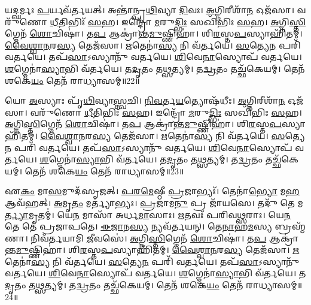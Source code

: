 𑌯𑌦𑍍\mbox{}\-\ul{𑌘}\-𑌰𑍍𑌮𑌃 \ul{𑌪}\-𑌰𑍍𑌯𑌵᳴𑌰𑍍𑌤𑌯𑌤𑍍।
𑌅𑌨𑍍𑌤𑌾॑𑌨𑍍𑌪𑍃\-\ul{𑌥𑌿}\-𑌵𑍍𑌯𑌾 \ul{𑌦𑌿}\-𑌵𑌃।
\-\ul{𑌅}\-𑌗𑍍𑌨𑌿𑌰𑍀𑌶𑌾᳴\-\ul{𑌨} 𑌓𑌜᳴𑌸𑌾।
𑌵𑌰𑍁᳴𑌣𑍋 \ul{𑌧𑍀}\-𑌤𑌿𑌭𑌿𑌃᳴ \ul{𑌸}\-𑌹।
𑌇𑌨𑍍𑌦𑍍𑌰𑍋᳴ \ul{𑌮}\-𑌰𑍁\-\ul{𑌦𑍍𑌭𑌿𑌃} 𑌸𑌖𑌿᳴𑌭𑌿𑌃 \ul{𑌸}\-𑌹।
\-\ul{𑌅}\-𑌗𑍍𑌨𑌿\-\ul{𑌸𑍍𑌤𑌿}\-𑌗𑍍𑌮𑍇𑌨᳴ \ul{𑌶𑍋}\-𑌚𑌿𑌷𑌾॑।
𑌤\-\ul{𑌪} 𑌆𑌕𑍍𑌰𑌾॑𑌨𑍍𑌤\-\ul{𑌮𑍁}\-𑌷𑍍𑌣𑌿𑌹𑌾॑।
𑌶𑌿\-\ul{𑌰}\-𑌸𑍍𑌤\-\ul{𑌪}\-𑌸𑍍𑌯𑌾𑌹𑌿᳴𑌤𑌮𑍍।
\-\ul{𑌵𑍈}\-\-\ul{𑌶𑍍𑌵𑌾}\-\-\ul{𑌨}\-𑌰\-\ul{𑌸𑍍𑌯} 𑌤𑍇𑌜᳴𑌸𑌾।
\-\ul{𑌋}\-𑌤𑍇𑌨𑌾॑\-\ul{𑌸𑍍𑌯} 𑌨𑌿 𑌵᳴𑌰𑍍𑌤𑌯𑍇।
\-\ul{𑌸}\-𑌤𑍍𑌯𑍇\-\ul{𑌨} 𑌪𑌰𑌿᳴ 𑌵𑌰𑍍𑌤𑌯𑍇।
𑌤𑌪᳴\-\ul{𑌸𑌾}\-\-𑌽𑌸𑍍𑌯𑌾𑌨𑍁᳴ 𑌵𑌰𑍍𑌤𑌯𑍇।
\-\ul{𑌶𑌿}\-𑌵𑍇\-\ul{𑌨𑌾}\-𑌸𑍍𑌯𑍋𑌪᳴ 𑌵𑌰𑍍𑌤𑌯𑍇।
\-\ul{𑌶}\-𑌗𑍍𑌮𑍇𑌨𑌾॑\-\ul{𑌸𑍍𑌯𑌾}\-𑌭𑌿 𑌵᳴𑌰𑍍𑌤𑌯𑍇।
𑌤\-\ul{𑌦𑍃}\-𑌤𑌂 𑌤\-\ul{𑌥𑍍𑌸}\-𑌤𑍍𑌯𑌮𑍍।
𑌤\-\ul{𑌦𑍍𑌵𑍍𑌰}\-𑌤𑌂 𑌤𑌚𑍍𑌛᳴𑌕𑍇𑌯𑌮𑍍।
𑌤𑍇𑌨᳴ 𑌶𑌕𑍇\-\ul{𑌯𑌂} 𑌤𑍇𑌨᳴ 𑌰𑌾𑌧𑍍𑌯𑌾𑌸𑌮𑍍॥22॥

𑌯𑍋 \ul{𑌅}\-𑌸𑍍𑌯𑌾𑌃 𑌪𑍃᳴\-\ul{𑌥𑌿}\-𑌵𑍍𑌯𑌾\-\ul{𑌸𑍍𑌤𑍍𑌵}\-𑌚𑌿।
\-\ul{𑌨𑌿}\-\-\ul{𑌵}\-𑌰𑍍𑌤\-\ul{𑌯}\-𑌤𑍍𑌯𑍋𑌷᳴𑌧𑍀𑌃।
\-\ul{𑌅}\-𑌗𑍍𑌨𑌿𑌰𑍀𑌶𑌾᳴\-\ul{𑌨} 𑌓𑌜᳴𑌸𑌾।
𑌵𑌰𑍁᳴𑌣𑍋 \ul{𑌧𑍀}\-𑌤𑌿𑌭𑌿𑌃᳴ \ul{𑌸}\-𑌹।
𑌇𑌨𑍍𑌦𑍍𑌰𑍋᳴ \ul{𑌮}\-𑌰𑍁\-\ul{𑌦𑍍𑌭𑌿𑌃} 𑌸𑌖𑌿᳴𑌭𑌿𑌃 \ul{𑌸}\-𑌹।
\-\ul{𑌅}\-𑌗𑍍𑌨𑌿\-\ul{𑌸𑍍𑌤𑌿}\-𑌗𑍍𑌮𑍇𑌨᳴ \ul{𑌶𑍋}\-𑌚𑌿𑌷𑌾॑।
𑌤\-\ul{𑌪} 𑌆𑌕𑍍𑌰𑌾॑𑌨𑍍𑌤\-\ul{𑌮𑍁}\-𑌷𑍍𑌣𑌿𑌹𑌾॑।
𑌶𑌿\-\ul{𑌰}\-𑌸𑍍𑌤\-\ul{𑌪}\-𑌸𑍍𑌯𑌾𑌹𑌿᳴𑌤𑌮𑍍।
\-\ul{𑌵𑍈}\-\-\ul{𑌶𑍍𑌵𑌾}\-\-\ul{𑌨}\-𑌰\-\ul{𑌸𑍍𑌯} 𑌤𑍇𑌜᳴𑌸𑌾।
\-\ul{𑌋}\-𑌤𑍇𑌨𑌾॑\-\ul{𑌸𑍍𑌯} 𑌨𑌿 𑌵᳴𑌰𑍍𑌤𑌯𑍇।
\-\ul{𑌸}\-𑌤𑍍𑌯𑍇\-\ul{𑌨} 𑌪𑌰𑌿᳴ 𑌵𑌰𑍍𑌤𑌯𑍇।
𑌤𑌪᳴\-\ul{𑌸𑌾}\-\-𑌽𑌸𑍍𑌯𑌾𑌨𑍁᳴ 𑌵𑌰𑍍𑌤𑌯𑍇।
\-\ul{𑌶𑌿}\-𑌵𑍇\-\ul{𑌨𑌾}\-𑌸𑍍𑌯𑍋𑌪᳴ 𑌵𑌰𑍍𑌤𑌯𑍇।
\-\ul{𑌶}\-𑌗𑍍𑌮𑍇𑌨𑌾॑\-\ul{𑌸𑍍𑌯𑌾}\-𑌭𑌿 𑌵᳴𑌰𑍍𑌤𑌯𑍇।
𑌤\-\ul{𑌦𑍃}\-𑌤𑌂 𑌤\-\ul{𑌥𑍍𑌸}\-𑌤𑍍𑌯𑌮𑍍।
𑌤\-\ul{𑌦𑍍𑌵𑍍𑌰}\-𑌤𑌂 𑌤𑌚𑍍𑌛᳴𑌕𑍇𑌯𑌮𑍍।
𑌤𑍇𑌨᳴ 𑌶𑌕𑍇\-\ul{𑌯𑌂} 𑌤𑍇𑌨᳴ 𑌰𑌾𑌧𑍍𑌯𑌾𑌸𑌮𑍍॥23॥

𑌏\-\ul{𑌕𑌂} 𑌮𑌾\-\ul{𑌸}\-𑌮𑍁𑌦᳴\-𑌸𑍃𑌜𑌤𑍍।
\-\ul{𑌪}\-\-\ul{𑌰}\-\-\ul{𑌮𑍇}\-𑌷𑍍𑌠𑍀 \ul{𑌪𑍍𑌰}\-𑌜𑌾𑌭𑍍𑌯𑌃᳴।
𑌤𑍇𑌨𑌾॑\-\ul{𑌭𑍍𑌯𑍋} 𑌮\-\ul{𑌹} 𑌆𑌵᳴𑌹𑌤𑍍।
\-\ul{𑌅}\-𑌮𑍃\-\ul{𑌤𑌂} 𑌮𑌰𑍍𑌤𑍍𑌯𑌾॑𑌭𑍍𑌯𑌃।
\-\ul{𑌪𑍍𑌰}\-𑌜𑌾𑌮\-\ul{𑌨𑍁} 𑌪𑍍𑌰 𑌜𑌾᳴𑌯𑌸𑍇।
𑌤𑌦𑍁᳴ 𑌤𑍇 𑌮\-\ul{𑌰𑍍𑌤𑍍𑌯𑌾}\-𑌮𑍃𑌤𑌮𑍍॑।
𑌯𑍇\-\ul{𑌨} 𑌮𑌾𑌸𑌾᳴ 𑌅𑌰𑍍𑌧\-\ul{𑌮𑌾}\-𑌸𑌾𑌃।
\-\ul{𑌋}\-𑌤𑌵𑌃᳴ 𑌪𑌰𑌿𑌵\-\ul{𑌥𑍍𑌸}\-𑌰𑌾𑌃।
𑌯𑍇\-\ul{𑌨} 𑌤𑍇 𑌤𑍇॑ 𑌪𑍍𑌰𑌜𑌾𑌪𑌤𑍇।
\-\ul{𑌈}\-\-\ul{𑌜𑌾}\-𑌨\-\ul{𑌸𑍍𑌯} 𑌨𑍍𑌯𑌵᳴𑌰𑍍𑌤𑌯𑌨𑍍।
𑌤𑍇\-\ul{𑌨𑌾}\-𑌹\-\ul{𑌮}\-𑌸𑍍𑌯 𑌬𑍍𑌰𑌹𑍍𑌮᳴𑌣𑌾।
𑌨𑌿𑌵᳴𑌰𑍍𑌤𑌯𑌾𑌮𑌿 \ul{𑌜𑍀}\-𑌵𑌸𑍇॑।
\-\ul{𑌅}\-𑌗𑍍𑌨𑌿\-\ul{𑌸𑍍𑌤𑌿}\-𑌗𑍍𑌮𑍇𑌨᳴ \ul{𑌶𑍋}\-𑌚𑌿𑌷𑌾॑।
𑌤\-\ul{𑌪} 𑌆𑌕𑍍𑌰𑌾॑𑌨𑍍𑌤\-\ul{𑌮𑍁}\-𑌷𑍍𑌣𑌿𑌹𑌾॑।
𑌶𑌿\-\ul{𑌰}\-𑌸𑍍𑌤\-\ul{𑌪}\-𑌸𑍍𑌯𑌾𑌹𑌿᳴𑌤𑌮𑍍।
\-\ul{𑌵𑍈}\-\-\ul{𑌶𑍍𑌵𑌾}\-\-\ul{𑌨}\-𑌰\-\ul{𑌸𑍍𑌯} 𑌤𑍇𑌜᳴𑌸𑌾।
\-\ul{𑌋}\-𑌤𑍇𑌨𑌾॑\-\ul{𑌸𑍍𑌯} 𑌨𑌿 𑌵᳴𑌰𑍍𑌤𑌯𑍇।
\-\ul{𑌸}\-𑌤𑍍𑌯𑍇\-\ul{𑌨} 𑌪𑌰𑌿᳴ 𑌵𑌰𑍍𑌤𑌯𑍇।
𑌤𑌪᳴\-\ul{𑌸𑌾}\-\-𑌽𑌸𑍍𑌯𑌾𑌨𑍁᳴ 𑌵𑌰𑍍𑌤𑌯𑍇।
\-\ul{𑌶𑌿}\-𑌵𑍇\-\ul{𑌨𑌾}\-𑌸𑍍𑌯𑍋𑌪᳴ 𑌵𑌰𑍍𑌤𑌯𑍇।
\-\ul{𑌶}\-𑌗𑍍𑌮𑍇𑌨𑌾॑\-\ul{𑌸𑍍𑌯𑌾}\-𑌭𑌿 𑌵᳴𑌰𑍍𑌤𑌯𑍇।
𑌤\-\ul{𑌦𑍃}\-𑌤𑌂 𑌤\-\ul{𑌥𑍍𑌸}\-𑌤𑍍𑌯𑌮𑍍।
𑌤\-\ul{𑌦𑍍𑌵𑍍𑌰}\-𑌤𑌂 𑌤𑌚𑍍𑌛᳴𑌕𑍇𑌯𑌮𑍍।
𑌤𑍇𑌨᳴ 𑌶𑌕𑍇\-\ul{𑌯𑌂} 𑌤𑍇𑌨᳴ 𑌰𑌾𑌧𑍍𑌯𑌾𑌸𑌮𑍍॥24॥

